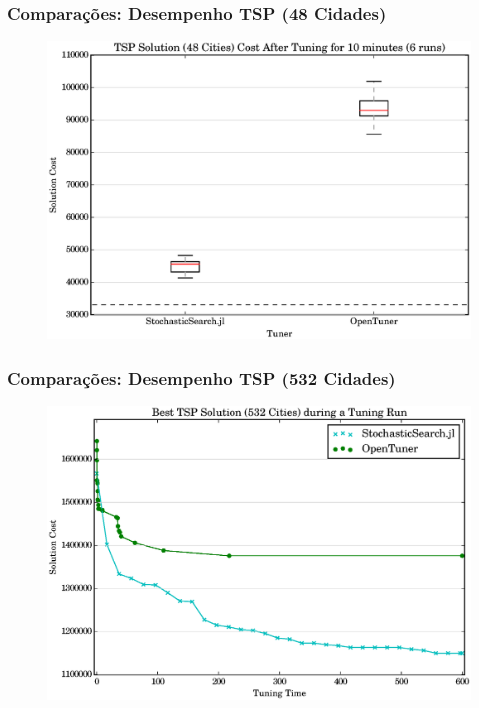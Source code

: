 \documentclass[10pt, compress]{beamer}
\begin{document}
\begin{frame}[fragile]
    \frametitle{Comparações: Desempenho TSP (48 Cidades)}
    \begin{figure}[H]
        \centering
        \includegraphics[width=1\textwidth]{att48_10min_comparison}
    \end{figure}%
\end{frame}

\begin{frame}[fragile]
    \frametitle{Comparações: Desempenho TSP (532 Cidades)}
    \begin{figure}[H]
        \centering
        \includegraphics[width=1\textwidth]{att532_10min_best_comparison}
    \end{figure}%
\end{frame}
\end{document}
